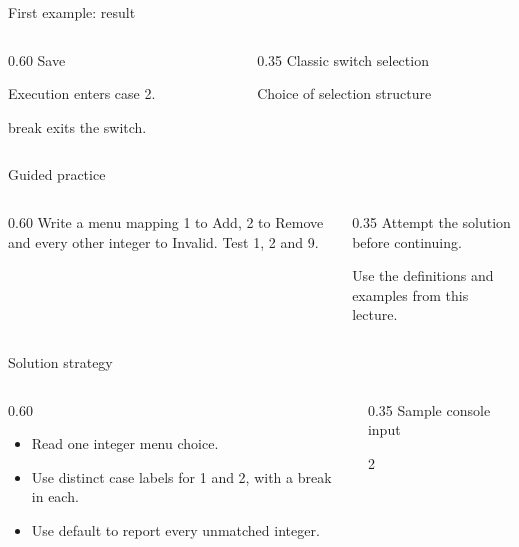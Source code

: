 \documentclass[10pt,aspectratio=169]{beamer}
\begin{document}
\begin{frame}[fragile,t]{First example: result}
\begin{columns}[T,onlytextwidth]\begin{column}{0.60\textwidth}
Save\par Execution enters case 2.\par break exits the switch.
\end{column}\begin{column}{0.35\textwidth}\small
Classic switch selection

Choice of selection structure
\end{column}\end{columns}
\end{frame}

\begin{frame}[fragile,t]{Guided practice}
\begin{columns}[T,onlytextwidth]\begin{column}{0.60\textwidth}
Write a menu mapping 1 to Add, 2 to Remove and every other integer to Invalid. Test 1, 2 and 9.
\end{column}\begin{column}{0.35\textwidth}\small
Attempt the solution before continuing.

Use the definitions and examples from this lecture.
\end{column}\end{columns}
\end{frame}

\begin{frame}[fragile,t]{Solution strategy}
\begin{columns}[T,onlytextwidth]\begin{column}{0.60\textwidth}
\begin{itemize}
\item Read one integer menu choice.
\item Use distinct case labels for 1 and 2, with a break in each.
\item Use default to report every unmatched integer.
\end{itemize}
\end{column}\begin{column}{0.35\textwidth}\small
Sample console input\par 2\par 
\end{column}\end{columns}
\end{frame}
\end{document}
